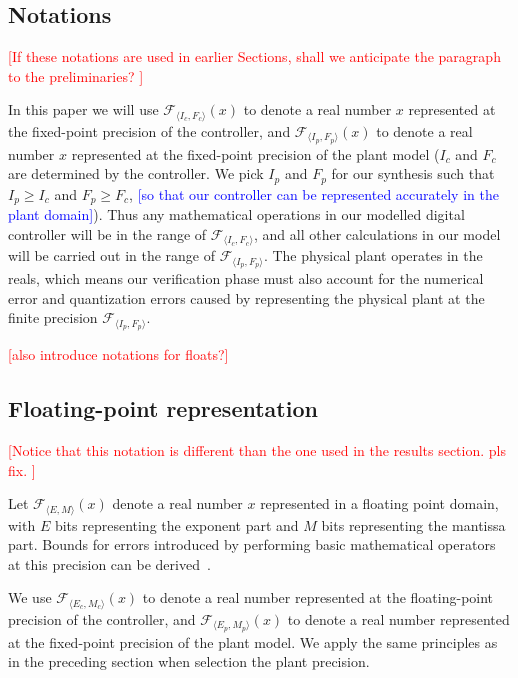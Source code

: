 \documentclass[twocolumn]{autart}    %
\renewcommand{\note}[1]{\textcolor{red}{[#1]}}
\newcommand{\reply}[1]{\textcolor{blue}{[#1]}}
\begin{document}
\subsection{Notations}  

\note{If these notations are used in earlier Sections, shall we anticipate the paragraph to the preliminaries? }

In this paper we will use $\mathcal{F}_{\langle I_c,F_c \rangle}(x)$ to denote a real
number $x$ represented at the fixed-point precision of the controller, and
$\mathcal{F}_{\langle I_p,F_p \rangle}(x)$ to denote a real number $x$
represented at the fixed-point precision of the plant model ($I_c$ and $F_c$
are determined by the controller.  We pick $I_p$ and $F_p$ for our synthesis
such that $I_p \geq I_c$ and $\allowbreak F_p \geq F_c$, \reply{so that our controller can be represented accurately in the plant domain}).  
Thus any mathematical operations in our modelled digital controller will be in the
range of $\mathcal{F}_{\langle I_c,F_c \rangle}$, and all other calculations
in our model will be carried out in the range of $\mathcal{F}_{\langle
I_p,F_p \rangle}$.  The physical plant operates in the reals, which means
our verification phase must also account for the numerical error and
quantization errors caused by representing the physical plant at the finite
precision $\mathcal{F}_{\langle I_p,F_p \rangle}$.

\note{also introduce notations for floats?}

\subsection{Floating-point representation}

\note{Notice that this notation is different than the one used in the results section. pls fix. }

Let $\mathcal{F}_{\langle E,M \rangle}(x)$ denote a real number $x$
represented in a floating point domain, with $E$ bits representing the exponent
part and $M$ bits representing the mantissa part. Bounds for errors introduced by performing basic mathematical operators at this precision can be derived~\cite{DBLP:conf/arith/BrainTRW15}.

We use $\mathcal{F}_{\langle E_c,M_c \rangle}(x)$ to denote a real number represented at the floating-point precision of the controller, and $\mathcal{F}_{\langle E_p,M_p \rangle}(x)$ to denote a real number represented at the fixed-point precision of the plant model. We apply the same principles as in the preceding section when selection the plant precision.
\end{document}
